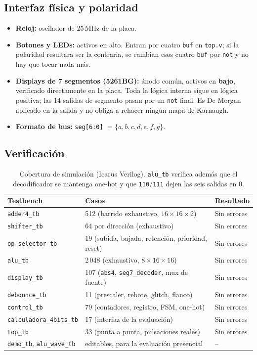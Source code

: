 \documentclass[11pt,a4paper]{article}
\newcommand{\bit}[1]{\texttt{#1}}
\newcommand{\sig}[1]{\texttt{#1}}
\begin{document}
\subsection{Interfaz física y polaridad}

\begin{itemize}[leftmargin=*,itemsep=1pt]
  \item \textbf{Reloj:} oscilador de 25\,MHz de la placa.
  \item \textbf{Botones y LEDs:} activos en alto. Entran por cuatro \bit{buf} en \sig{top.v}; si la polaridad resultara ser la contraria, se cambian esos cuatro \bit{buf} por \bit{not} y no hay que tocar nada más.
  \item \textbf{Displays de 7 segmentos (5261BG):} ánodo común, activos en \textbf{bajo}, verificado directamente en la placa. Toda la lógica interna sigue en lógica positiva; las 14 salidas de segmento pasan por un \bit{not} final. Es De Morgan aplicado en la salida y no obliga a rehacer ningún mapa de Karnaugh.
  \item \textbf{Formato de bus:} \sig{seg[6:0]} $=\{a,b,c,d,e,f,g\}$.
\end{itemize}

\subsection{Verificación}

\begin{table}[H]
\centering
\small
\begin{tabular}{@{}lll@{}}
\toprule
\textbf{Testbench} & \textbf{Casos} & \textbf{Resultado} \\
\midrule
\sig{adder4\_tb}            & 512 (barrido exhaustivo, $16\times16\times2$) & Sin errores \\
\sig{shifter\_tb}           & 64 por dirección (exhaustivo)                 & Sin errores \\
\sig{op\_selector\_tb}      & 19 (subida, bajada, retención, prioridad, reset) & Sin errores \\
\sig{alu\_tb}                & 2\,048 (exhaustivo, $8\times16\times16$)      & Sin errores \\
\sig{display\_tb}           & 107 (\sig{abs4}, \sig{seg7\_decoder}, mux de fuente) & Sin errores \\
\sig{debounce\_tb}          & 11 (prescaler, rebote, glitch, flanco)        & Sin errores \\
\sig{control\_tb}           & 79 (contadores, registro, FSM, one-hot)       & Sin errores \\
\sig{calculadora\_4bits\_tb} & 17 (interfaz de la evaluación)                & Sin errores \\
\sig{top\_tb}                & 33 (punta a punta, pulsaciones reales)        & Sin errores \\
\sig{demo\_tb}, \sig{alu\_wave\_tb} & editables, para la evaluación presencial & -- \\
\bottomrule
\end{tabular}
\caption{Cobertura de simulación (Icarus Verilog). \sig{alu\_tb} verifica además que el decodificador se mantenga one-hot y que \bit{110}/\bit{111} dejen las seis salidas en 0.}
\end{table}
\end{document}
